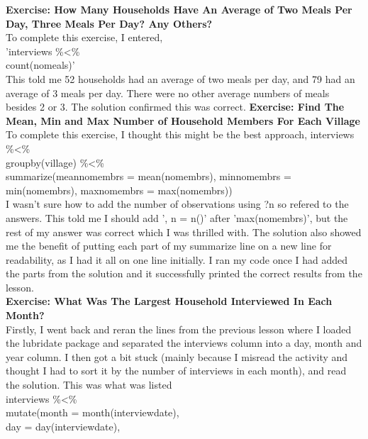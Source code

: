 \documentclass{article}
\begin{document}
\begin{FlushLeft}
\textbf{Exercise: How Many Households Have An Average of Two Meals Per Day, Three Meals Per Day? Any Others?}\\ 
To complete this exercise, I entered,\\
'interviews \%\textless\%\\
count(no\textunderscore meals)'\\
This told me 52 households had an average of two meals per day, and 79 had an average of 3 meals per day. There were no other average numbers of meals besides 2 or 3. The solution confirmed this was correct.
\vspace{5mm}
\textbf{Exercise: Find The Mean, Min and Max Number of Household Members For Each Village}\\ 
To complete this exercise, I thought this might be the best approach,
interviews \%\textless\%\\
group\textunderscore by(village) \%\textless\%\\
summarize(mean\textunderscore no\textunderscore membrs = mean(no\textunderscore membrs), min\textunderscore no\textunderscore membrs = min(no\textunderscore membrs),
max\textunderscore no\textunderscore membrs = max(no\textunderscore membrs))\\
I wasn't sure how to add the number of observations using ?n so refered to the answers. This told me I should add ', n = n()' after 'max(no\textunderscore membrs)', but the rest of my answer was correct which I was thrilled with. The solution also showed me the benefit of putting each part of my summarize line on a new line for readability, as I had it all on one line initially. I ran my code once I had added the parts from the solution and it successfully printed the correct results from the lesson.\\
\vspace{5mm}
\textbf{Exercise: What Was The Largest Household Interviewed In Each Month?}\\ 
Firstly, I went back and reran the lines from the previous lesson where I loaded the lubridate package and separated the interviews column into a day, month and year column. I then got a bit stuck (mainly because I misread the activity and thought I had to sort it by the number of interviews in each month), and read the solution. This was what was listed\\
interviews \%\textless\%\\
mutate(month = month(interview\textunderscore date),\\
day = day(interview\textunderscore date),\\

\end{FlushLeft}
\end{document}
